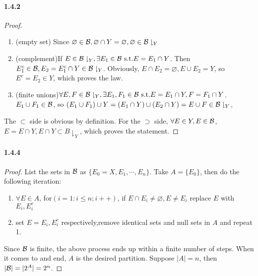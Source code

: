 \documentclass{article}
\begin{document}
\paragraph{1.4.2}
\begin{proof}
\begin{enumerate}
\item{(empty set)} Since $\varnothing\in \mathcal{B},\varnothing\cap Y=\varnothing,\varnothing\in \mathcal{B}\downharpoonright_{Y}$
\item{(complement)}If $E\in \mathcal{B}\downharpoonright_{Y}, \exists E_1\in\mathcal{B}\text{ s.t.} E=E_1\cap Y$. Then $E_1^c\in \mathcal{B}, E_2=E_1^c\cap Y\in \mathcal{B}\downharpoonright_{Y}$. Obviously, $E\cap E_2=\varnothing, E\cup E_2=Y$, so $E^c=E_2\in Y$, which proves the law.
\item{(finite unions)}$\forall E,F\in \mathcal{B}\downharpoonright_{Y},\exists E_1,F_1\in \mathcal{B}\text{ s.t.} E=E_1\cap Y, F=F_1\cap Y$. $E_1\cup F_1\in\mathcal{B}$, so $(E_1\cup F_1)\cup Y=(E_1\cap Y)\cup (E_2\cap Y)=E\cup F\in \mathcal{B}\downharpoonright_{Y}$, 
\end{enumerate}

The $\subset$ side is obvious by definition. For the $\supset$ side, $\forall E\in Y, E\in \mathcal{B}$, $E=E\cap Y, E\cap Y\subset B\downharpoonright_{Y}$, which proves the statement. 
\end{proof}

\paragraph{1.4.4}
\begin{proof}
List the sets in $\mathcal{B}$ as $\{E_0=X,E_1,\cdots,E_n\}$. Take $A=\{E_0\}$, then do the following iteration:
\begin{enumerate}
\item{} $\forall E\in A$, for$(i=1:i\leq n;i++)$, if $E\cap E_i\neq\varnothing, E\neq E_i$ replace $E$ with $E_i, E_i^c$
\item set $E=E_i,E_i^c$ respectively,remove identical sets and null sets in $A$ and repeat 1. 
\end{enumerate} 
Since $\mathcal{B}$ is finite, the above process ends up within a finite number of steps. When it comes to and end, $A$ is the desired partition. Suppose $|A|=n$, then $|\mathcal{B}|=|2^A|=2^n$.
\end{proof}
\end{document}

